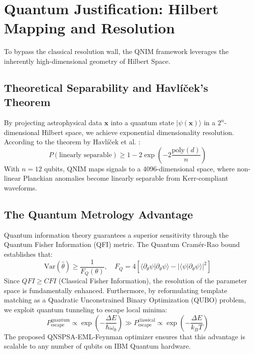 \documentclass[11pt,a4paper,spanish]{book}
\numberwithin{equation}{chapter}
\numberwithin{figure}{chapter}
\numberwithin{equation}{chapter}
\numberwithin{figure}{chapter}
\numberwithin{table}{chapter}
\begin{document}
\section{Quantum Justification: Hilbert Mapping and Resolution}

To bypass the classical resolution wall, the QNIM framework leverages the inherently high-dimensional geometry of Hilbert Space.

\subsection{Theoretical Separability and Havlíček's Theorem}

By projecting astrophysical data $\mathbf{x}$ into a quantum state $|\psi(\mathbf{x})\rangle$ in a $2^n$-dimensional Hilbert space, we achieve exponential dimensionality resolution. According to the theorem by Havlíček et al. \cite{Havlicek_2019}:
\begin{equation}
    P(\text{linearly separable}) \ge 1 - 2\exp\left( -2 \frac{\text{poly}(d)}{n} \right)
\end{equation}
With $n=12$ qubits, QNIM maps signals to a 4096-dimensional space, where non-linear Planckian anomalies become linearly separable from Kerr-compliant waveforms.

\subsection{The Quantum Metrology Advantage}

Quantum information theory guarantees a superior sensitivity through the Quantum Fisher Information (QFI) metric. The Quantum Cramér-Rao bound establishes that:
\begin{equation}
    \text{Var}(\hat{\theta}) \ge \frac{1}{F_Q(\theta)}, \quad F_Q = 4 \left[ \langle \partial_\theta \psi | \partial_\theta \psi \rangle - | \langle \psi | \partial_\theta \psi \rangle |^2 \right]
\end{equation}
Since $QFI \ge CFI$ (Classical Fisher Information), the resolution of the parameter space is fundamentally enhanced. Furthermore, by reformulating template matching as a Quadratic Unconstrained Binary Optimization (QUBO) problem, we exploit quantum tunneling to escape local minima:
\begin{equation}
    P_{\text{escape}}^{\text{quantum}} \propto \exp\left( -\frac{\Delta E}{\hbar \omega_0} \right) \gg P_{\text{escape}}^{\text{classical}} \propto \exp\left( -\frac{\Delta E}{k_B T} \right)
\end{equation}
The proposed QNSPSA-EML-Feynman optimizer ensures that this advantage is scalable to any number of qubits on IBM Quantum hardware.
\end{document}
